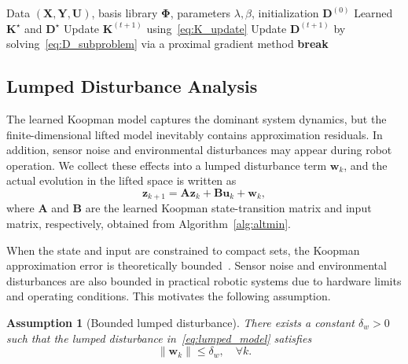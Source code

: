 \documentclass[letterpaper,10pt,conference]{ieeeconf}
\newtheorem{assumption}{Assumption}[section]
\newcommand{\uvec}{\mathbf{u}}
\newcommand{\z}{\mathbf{z}}
\newcommand{\w}{\mathbf{w}}
\newcommand{\Kmat}{\mathbf{K}}
\newcommand{\Dmat}{\mathbf{D}}
\newcommand{\A}{\mathbf{A}}
\newcommand{\B}{\mathbf{B}}
\newcommand{\Umat}{\mathbf{U}}
\newcommand{\X}{\mathbf{X}}
\newcommand{\Y}{\mathbf{Y}}
\newcommand{\Phib}{\boldsymbol{\Phi}}
\begin{document}
\begin{algorithm}[htbp]
\caption{Block Coordinate Descent Algorithm for Koopman Representation Learning}
\label{alg:altmin}
\begin{algorithmic}[1]
\REQUIRE Data $(\X,\Y,\Umat)$, basis library $\Phib$, parameters $\lambda,\beta$, initialization $\Dmat^{(0)}$
\ENSURE Learned $\Kmat^\star$ and $\Dmat^\star$
    \STATE Update $\Kmat^{(t+1)}$ using~\eqref{eq:K_update}
    \STATE Update $\Dmat^{(t+1)}$ by solving~\eqref{eq:D_subproblem} via a proximal gradient method
        \STATE \textbf{break}
    \ENDIF
\ENDFOR
\end{algorithmic}
\end{algorithm}

\subsection{Lumped Disturbance Analysis}
\label{subsec:error_quantification}

The learned Koopman model captures the dominant system dynamics, but the finite-dimensional lifted model inevitably contains approximation residuals. In addition, sensor noise and environmental disturbances may appear during robot operation. We collect these effects into a lumped disturbance term $\w_k$, and the actual evolution in the lifted space is written as
\begin{equation}
\label{eq:lumped_model}
\z_{k+1} = \A\z_k + \B\uvec_k + \w_k,
\end{equation}
where $\A$ and $\B$ are the learned Koopman state-transition matrix and input matrix, respectively, obtained from Algorithm~\ref{alg:altmin}.

When the state and input are constrained to compact sets, the Koopman approximation error is theoretically bounded~\cite{Korda2018MPC}. Sensor noise and environmental disturbances are also bounded in practical robotic systems due to hardware limits and operating conditions. This motivates the following assumption.

{
\begin{assumption}[Bounded lumped disturbance]
\label{assump:bounded_disturbance}
There exists a constant $\delta_w>0$ such that the lumped disturbance in~\eqref{eq:lumped_model} satisfies
\begin{equation}
\|\w_k\| \le \delta_w, \quad \forall k.
\end{equation}
\end{assumption}
}
\end{document}

